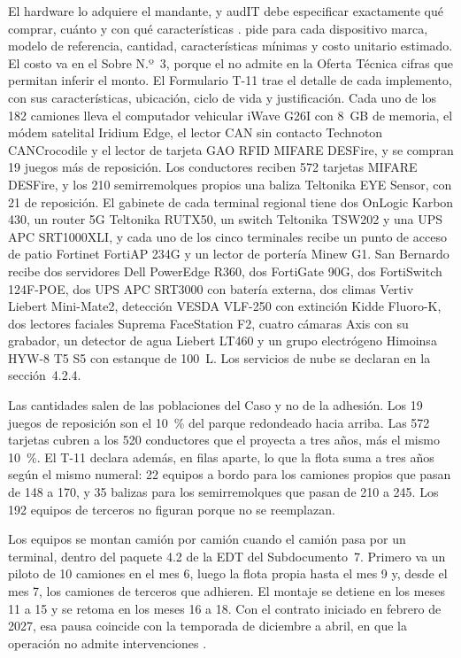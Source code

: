 El hardware lo adquiere el mandante, y audIT debe especificar exactamente qué comprar, cuánto y con
qué características .  pide para cada dispositivo marca,
modelo de referencia, cantidad, características mínimas y costo unitario estimado. El costo va en el
Sobre N.º~3, porque el  no admite en la Oferta Técnica cifras que permitan inferir el
monto. El Formulario T-11 trae el detalle de cada
implemento, con sus características, ubicación, ciclo de vida y justificación. Cada uno de los 182 camiones lleva el computador vehicular iWave G26I con 8~GB de memoria, el
módem satelital Iridium Edge, el lector CAN sin contacto Technoton CANCrocodile y el lector de tarjeta
GAO RFID MIFARE DESFire, y se compran 19 juegos más de reposición. Los conductores reciben 572 tarjetas
MIFARE DESFire, y los 210 semirremolques propios una baliza Teltonika EYE Sensor, con 21 de reposición.
El gabinete de cada terminal regional tiene dos OnLogic Karbon 430, un router 5G Teltonika RUTX50, un
switch Teltonika TSW202 y una UPS APC SRT1000XLI, y cada uno de los cinco terminales recibe un punto de
acceso de patio Fortinet FortiAP 234G y un lector de portería Minew G1. San Bernardo recibe dos
servidores Dell PowerEdge R360, dos FortiGate 90G, dos FortiSwitch 124F-POE, dos UPS APC SRT3000 con
batería externa, dos climas Vertiv Liebert Mini-Mate2, detección VESDA VLF-250 con extinción Kidde
Fluoro-K, dos lectores faciales Suprema FaceStation F2, cuatro cámaras Axis con su grabador, un detector
de agua Liebert LT460 y un grupo electrógeno Himoinsa HYW-8 T5 S5 con estanque de 100~L. Los servicios
de nube se declaran en la sección~4.2.4.

Las cantidades salen de las poblaciones del Caso y no de la adhesión. Los 19 juegos de reposición son el
10~\% del parque redondeado hacia arriba. Las 572 tarjetas cubren a los 520 conductores que el
 proyecta a tres años, más el mismo 10~\%. El T-11 declara además, en filas
aparte, lo que la flota suma a tres años según el mismo numeral: 22 equipos a bordo para los camiones
propios que pasan de 148 a 170, y 35 balizas para los semirremolques que pasan de 210 a 245. Los 192
equipos de terceros no figuran porque no se reemplazan.

Los equipos se montan camión por camión cuando el camión pasa por un terminal, dentro del paquete 4.2
de la EDT del Subdocumento~7. Primero va un piloto de 10 camiones en el mes 6, luego la flota propia
hasta el mes 9 y, desde el mes 7, los camiones de terceros que adhieren. El montaje se detiene en los
meses 11 a 15 y se retoma en los meses 16 a 18. Con el contrato iniciado en febrero de 2027, esa pausa
coincide con la temporada de diciembre a abril, en que la operación no admite intervenciones
.

